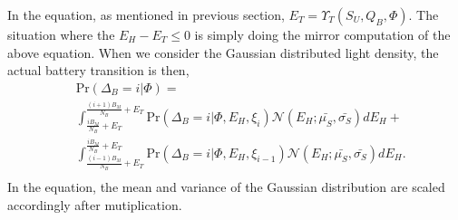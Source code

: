\documentclass[conference]{IEEEtran}
\begin{document}
In the equation, as mentioned in previous section, \(E_T = \Upsilon_T(S_U, Q_B, \Phi)\).
The situation where the \(E_H - E_T \le 0\) is simply doing the mirror computation of the above equation.
When we consider the Gaussian distributed light density, the actual battery transition is then,
\begin{equation}\label{battery}
\begin{aligned}
	&\mbox{Pr}\left(\Delta_B = i |\Phi\right) = \\
	&\int_{\frac{iB_M}{N_B} + E_T}^{\frac{\left(i+1\right)B_M}{N_B} + E_T}
	\mbox{Pr}\left(\Delta_B = i |\Phi, E_H, \xi_i\right) \mathcal{N}\left(E_H;\bar{\mu_S},\bar{\sigma_S}\right) dE_H+\\
	& \int_{\frac{\left(i-1\right)B_M}{N_B} + E_T}^{\frac{iB_M}{N_B} + E_T}
	\mbox{Pr}\left(\Delta_B = i |\Phi, E_H, \xi_{i-1}\right) \mathcal{N}\left(E_H;\bar{\mu_S},\bar{\sigma_S}\right) dE_H.\\
\end{aligned}
\end{equation}
In the equation, the mean and variance of the Gaussian distribution are scaled accordingly after mutiplication.
\end{document}
